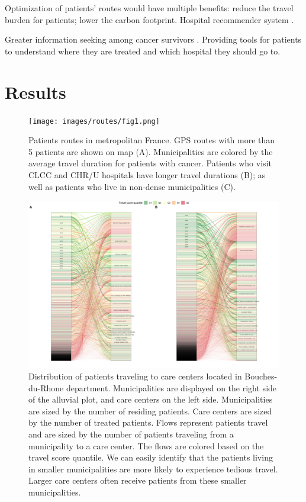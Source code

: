 Optimization of patients' routes would have multiple benefits: reduce the travel burden for patients; lower the carbon footprint.
Hospital recommender system \cite{zhang_idoctor_2017,han_hybrid_2018,narducci_recommender_2015,hoens_reliable_2010,tran_recommender_2021}.

Greater information seeking among cancer survivors \cite{finney_rutten_cancer-related_2016}. Providing tools for patients to understand where they are treated and which hospital they should go to.

\section{Results}

\begin{figure}[t]
    \texttt{[image: images/routes/fig1.png]}
    \centering
    \caption{
        Patients routes in metropolitan France. GPS routes with more than 5 patients are shown on map (A). Municipalities are colored by the average travel duration for patients with cancer. Patients who visit CLCC and CHR/U hospitals have longer travel durations (B); as well as patients who live in non-dense municipalities (C).
    }
    \label{fig:routes-duration-france}
\end{figure}

\begin{figure}[t]
    \includegraphics[width=\textwidth]{images/routes/fig6.png}
    \centering
    \caption{
        Distribution of patients traveling to care centers located in Bouches-du-Rhone department. Municipalities are displayed on the right side of the alluvial plot, and care centers on the left side. Municipalities are sized by the number of residing patients. Care centers are sized by the number of treated patients. Flows represent patients travel and are sized by the number of patients traveling from a municipality to a care center. The flows are colored based on the travel score quantile. We can easily identify that the patients living in smaller municipalities are more likely to experience tedious travel. Larger care centers often receive patients from these smaller municipalities.
    }
    \label{fig:routes-alluvial-13}
\end{figure}

